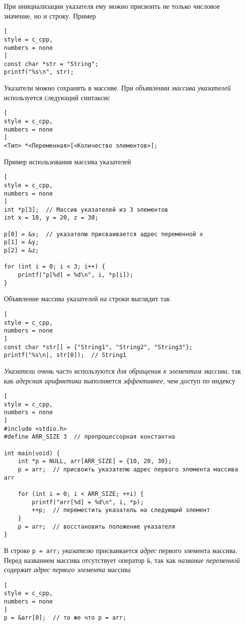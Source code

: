 \documentclass[%
	11pt,
	a4paper,
	utf8,
		]{article}
\begin{document}
При инициализации указателя ему можно присвоить не только числовое значение, но и строку. Пример
\begin{lstlisting}[
style = c_cpp,
numbers = none	
]
const char *str = "String";
printf("%s\n", str);
\end{lstlisting}

Указатели можно сохранять в массиве. При объявлении \emph{массива указателей} используется следующий синтаксис
\begin{lstlisting}[
style = c_cpp,
numbers = none
]
<Тип> *<Переменная>[<Количество элементов>];
\end{lstlisting}

Пример использования массива указателей
\begin{lstlisting}[
style = c_cpp,
numbers = none
]
int *p[3];  // Массив указателей из 3 элементов
int x = 10, y = 20, z = 30;

p[0] = &x;  // указателю присваивается адрес переменной x
p[1] = &y;
p[2] = &z;

for (int i = 0; i < 3; i++) {
    printf("p[%d] = %d\n", i, *p[i]);
}
\end{lstlisting}

Объявление массива указателей на строки выглядит так
\begin{lstlisting}[
style = c_cpp,
numbers = none
]
const char *str[] = {"String1", "String2", "String3"};
printf("%s\n|, str[0]);  // String1
\end{lstlisting}

\emph{Указатели} очень часто используются \emph{для обращения к элементам массива}, так как \emph{адерсная арифметика} выполняется \emph{эффективнее}, чем доступ по индексу \cite[]{prokhorenok-prog-c:2020}
\begin{lstlisting}[
style = c_cpp,
numbers = none
]
#include <stdio.h>
#define ARR_SIZE 3  // препроцессорная константна

int main(void) {
    int *p = NULL, arr[ARR_SIZE] = {10, 20, 30};
    p = arr;  // присвоить указателю адрес первого элемента массива arr
    
    for (int i = 0; i < ARR_SIZE; ++i) {
        printf("arr[%d] = %d\n", i, *p);
        ++p;  // переместить указатель на следующий элемент
    }
    p = arr;  // восстановить положение указателя
}
\end{lstlisting}

В строке \verb|p = arr;| \emph{указателю} присваивается \emph{адрес} первого элемента массива. Перед названием массива отсутствует оператор \verb|&|, так как \emph{название переменной} содержит \emph{адрес первого элемента} массива
\begin{lstlisting}[
style = c_cpp,
numbers = none
]
p = &arr[0];  // то же что p = arr;
\end{lstlisting}
\end{document}

